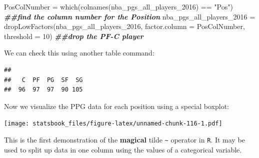 \documentclass[
]{book}
\newenvironment{Shaded}{\begin{snugshade}}{\end{snugshade}}
\newcommand{\AttributeTok}[1]{\textcolor[rgb]{0.77,0.63,0.00}{#1}}
\newcommand{\DecValTok}[1]{\textcolor[rgb]{0.00,0.00,0.81}{#1}}
\newcommand{\DocumentationTok}[1]{\textcolor[rgb]{0.56,0.35,0.01}{\textbf{\textit{#1}}}}
\newcommand{\FunctionTok}[1]{\textcolor[rgb]{0.00,0.00,0.00}{#1}}
\newcommand{\NormalTok}[1]{#1}
\newcommand{\OtherTok}[1]{\textcolor[rgb]{0.56,0.35,0.01}{#1}}
\newcommand{\SpecialCharTok}[1]{\textcolor[rgb]{0.00,0.00,0.00}{#1}}
\newcommand{\StringTok}[1]{\textcolor[rgb]{0.31,0.60,0.02}{#1}}
\theoremstyle{definition}
\theoremstyle{definition}
\theoremstyle{definition}
\theoremstyle{definition}
\theoremstyle{remark}
\begin{document}
\begin{Shaded}
\begin{Highlighting}[]
\NormalTok{PosColNumber }\OtherTok{=} \FunctionTok{which}\NormalTok{(}\FunctionTok{colnames}\NormalTok{(nba\_pgs\_all\_players\_2016) }\SpecialCharTok{==} \StringTok{"Pos"}\NormalTok{)  }\DocumentationTok{\#\#find the column number for the Position}
\NormalTok{nba\_pgs\_all\_players\_2016 }\OtherTok{=} \FunctionTok{dropLowFactors}\NormalTok{(nba\_pgs\_all\_players\_2016, }\AttributeTok{factor.column =}\NormalTok{ PosColNumber,}
    \AttributeTok{threshold =} \DecValTok{10}\NormalTok{)  }\DocumentationTok{\#\#drop the PF{-}C player}
\end{Highlighting}
\end{Shaded}

We can check this using another table command:

\begin{Shaded}
\end{Shaded}

\begin{verbatim}
## 
##   C  PF  PG  SF  SG 
##  96  97  97  90 105
\end{verbatim}

Now we visualize the PPG data for each position using a special boxplot:

\begin{Shaded}
\end{Shaded}

\texttt{[image: statsbook\_files/figure-latex/unnamed-chunk-116-1.pdf]}

This is the first demonstration of the \textbf{magical} tilde \texttt{\textasciitilde{}} operator in \texttt{R}. It may be used to split up data in one column using the values of a categorical variable.
\end{document}
